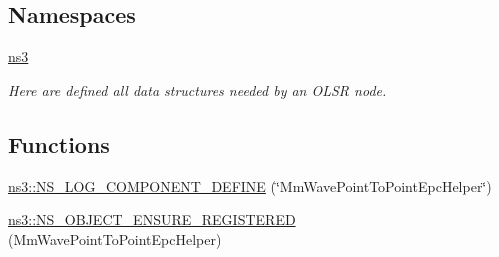 \subsection*{Namespaces}
\begin{DoxyCompactItemize}
\item 
 \hyperlink{namespacens3}{ns3}
\begin{DoxyCompactList}\small\item\em Here are defined all data structures needed by an O\+L\+SR node. \end{DoxyCompactList}\end{DoxyCompactItemize}
\subsection*{Functions}
\begin{DoxyCompactItemize}
\item 
\hyperlink{namespacens3_ab20a578d17c633dad45499d62a2f2fca}{ns3\+::\+N\+S\+\_\+\+L\+O\+G\+\_\+\+C\+O\+M\+P\+O\+N\+E\+N\+T\+\_\+\+D\+E\+F\+I\+NE} (\char`\"{}Mm\+Wave\+Point\+To\+Point\+Epc\+Helper\char`\"{})
\item 
\hyperlink{namespacens3_a1b87ccf60873d921e766da0e7002ca4d}{ns3\+::\+N\+S\+\_\+\+O\+B\+J\+E\+C\+T\+\_\+\+E\+N\+S\+U\+R\+E\+\_\+\+R\+E\+G\+I\+S\+T\+E\+R\+ED} (Mm\+Wave\+Point\+To\+Point\+Epc\+Helper)
\end{DoxyCompactItemize}
